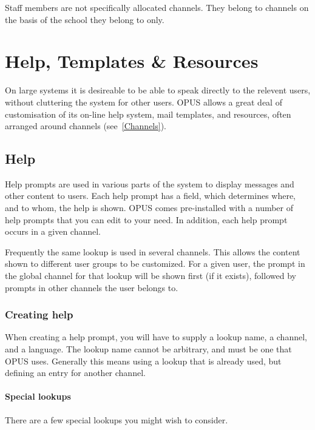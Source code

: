 \documentclass[12 pt]{book}
\begin{document}
Staff members are not specifically allocated channels. They belong to channels
on the basis of the school they belong to only.

%
%
%

\chapter{Help, Templates \& Resources}

On large systems it is desireable to be able to speak directly to the
relevent users, without cluttering the system for other users. OPUS
allows a great deal of customisation of its on-line help system, mail
templates, and resources, often arranged around channels (see~\ref{Channels}).

\section{Help}
\label{Help}

Help prompts are used in various parts of the system to display messages
and other content to users. Each help prompt has a  field,
which determines where, and to whom, the help is shown. OPUS comes
pre-installed with a number of help prompts that you can edit to your
need. In addition, each help prompt occurs in a given channel.

Frequently the same lookup is used in several channels. This allows the
content shown to different user groups to be customized. For a given
user, the prompt in the global channel for that lookup will be shown first
(if it exists), followed by prompts in other channels the user belongs to.

\subsection{Creating help}

When creating a help prompt, you will have to supply a lookup name, a
channel, and a language. The lookup name cannot be arbitrary, and must
be one that OPUS uses. Generally this means using a lookup that is
already used, but defining an entry for another channel.

\subsubsection{Special lookups}

There are a few special lookups you might wish to consider.
\end{document}
